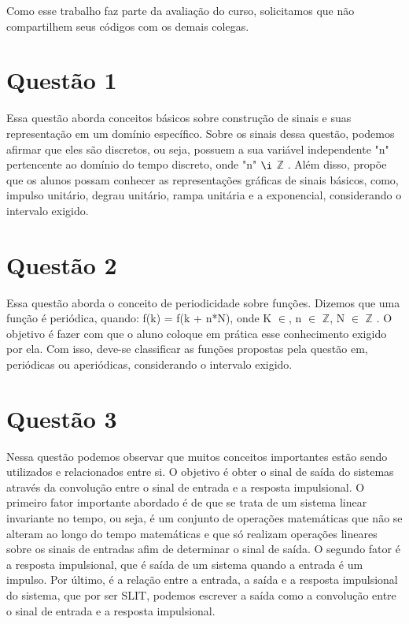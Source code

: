 \documentclass[12pt,a4paper]{report}
\begin{document}
Como esse trabalho faz parte da avaliação do curso, solicitamos que não compartilhem seus códigos com os demais colegas.

\section*{Questão 1}
Essa questão aborda conceitos básicos sobre construção de sinais e suas representação em um domínio específico. Sobre os sinais dessa questão, podemos afirmar que eles são discretos, ou seja, possuem a sua variável independente "n" pertencente ao domínio do tempo discreto, onde "n" $\i$  $\mathbb{Z}$ . Além disso, propõe que os alunos possam conhecer as representações gráficas de sinais básicos, como, impulso unitário, degrau unitário, rampa unitária e a exponencial, considerando o intervalo exigido.  

\section*{Questão 2}
Essa questão aborda o conceito de periodicidade sobre funções. Dizemos que uma função é periódica, quando: f(k) = f(k + n*N), onde K $\in$, n $\in$ $\mathbb{Z}$, N $\in$ $\mathbb {Z}$ .
O objetivo é fazer com que o aluno coloque em prática esse conhecimento exigido por ela. Com isso, deve-se classificar as funções propostas pela questão em, periódicas ou aperiódicas, considerando o intervalo exigido.

\section*{Questão 3}
Nessa questão podemos observar que muitos conceitos importantes estão sendo utilizados e relacionados entre si. O objetivo é obter o sinal de saída do sistemas através da convolução entre o sinal de entrada e a resposta impulsional. O primeiro fator importante abordado é de que se trata de um sistema linear invariante no tempo, ou seja, é um conjunto de operações matemáticas que não se alteram ao longo do tempo matemáticas e que só realizam operações lineares sobre os sinais de entradas afim de determinar o sinal de saída. O segundo fator é a resposta impulsional, que é saída de um sistema quando a entrada é um impulso. Por último, é a relação entre a entrada, a saída e a resposta impulsional do sistema, que por ser SLIT, podemos escrever a saída como a convolução entre o sinal de entrada e a resposta impulsional.
\end{document}
